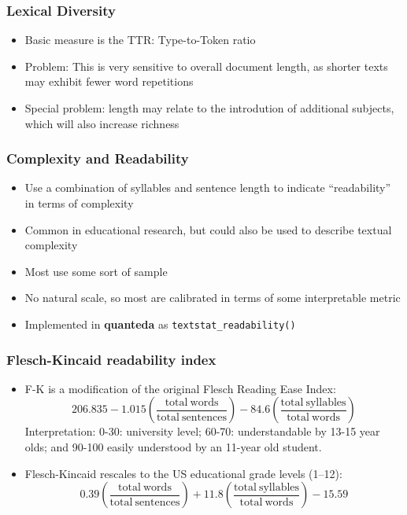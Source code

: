 \documentclass{beamer}
\begin{document}
\begin{frame}
	\frametitle{Lexical Diversity}
	\begin{itemize}
		\item Basic measure is the \alert{TTR}: Type-to-Token ratio
		\item Problem: This is very sensitive to overall document length, as
		shorter texts may exhibit fewer word repetitions
		\item Special problem: length may relate to the introdution of
		additional subjects, which will also increase richness
	\end{itemize}
\end{frame}



\begin{frame}
	\frametitle{Complexity and Readability}
	\begin{itemize}
		\item Use a combination of syllables and sentence length to indicate
		``readability'' in terms of complexity
		\item Common in educational research, but could also be used to
		describe textual complexity
		\item Most use some sort of sample
		\item No natural scale, so most are calibrated in terms of some
		interpretable metric
		\item Implemented in \textbf{quanteda} as \texttt{textstat\_readability()}
	\end{itemize}
\end{frame}


\begin{frame}
	\frametitle{Flesch-Kincaid readability index}
	\begin{itemize}
		\item F-K is a modification of the original \alert{Flesch Reading Ease Index}:
		\begin{equation*}
		206.835 - 1.015 \left( \frac{\mathrm{total\ words}}{\mathrm{total\
				sentences}} \right) - 84.6 \left( \frac{\mathrm{total\ syllables}}{\mathrm{total\
				words}} \right)
		\end{equation*}
		{\color{blue} Interpretation:} 0-30: university level; 60-70:
		understandable by 13-15 year olds; and 90-100 easily understood by
		an 11-year old student.
		\item \pause \alert{Flesch-Kincaid} rescales to the US educational grade
		levels (1--12):
		\begin{equation*}
		0.39 \left( \frac{\mathrm{total\ words}}{\mathrm{total\
				sentences}} \right) + 11.8 \left( \frac{\mathrm{total\ syllables}}{\mathrm{total\
				words}} \right) - 15.59
		\end{equation*}
	\end{itemize}
\end{frame}
\end{document}
